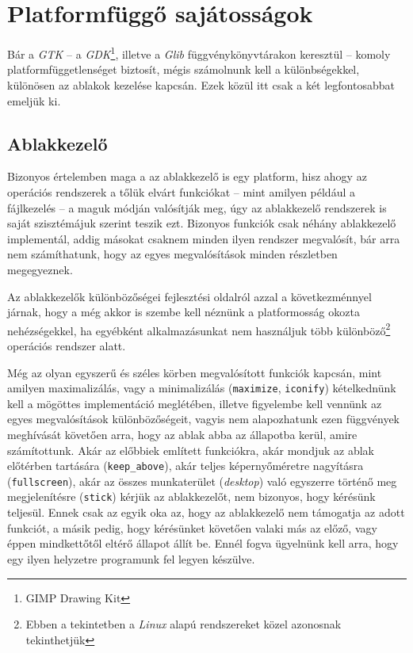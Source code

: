 \section{Platformfüggő sajátosságok}

Bár a \textit{GTK} -- a \textit{GDK}\footnote{GIMP Drawing Kit}, illetve a \textit{Glib} függvénykönyvtárakon keresztül -- komoly platformfüggetlenséget biztosít, mégis számolnunk kell a különbségekkel, különösen az ablakok kezelése kapcsán. Ezek közül itt csak a két legfontosabbat emeljük ki.

\subsection{Ablakkezelő}

Bizonyos értelemben maga a az ablakkezelő is egy platform, hisz ahogy az operációs rendszerek a tőlük elvárt funkciókat -- mint amilyen például a fájlkezelés -- a maguk módján valósítják meg, úgy az ablakkezelő rendszerek is saját szisztémájuk szerint teszik ezt. Bizonyos funkciók csak néhány ablakkezelő implementál, addig másokat csaknem minden ilyen rendszer megvalósít, bár arra nem számíthatunk, hogy az egyes megvalósítások minden részletben megegyeznek.

Az ablakkezelők különbözőségei fejlesztési oldalról azzal a következménnyel járnak, hogy a még akkor is szembe kell néznünk a platformosság okozta nehézségekkel, ha egyébként alkalmazásunkat nem használjuk több különböző\footnote{Ebben a tekintetben a \textit{Linux} alapú rendszereket közel azonosnak tekinthetjük} operációs rendszer alatt.

Még az olyan egyszerű és széles körben megvalósított funkciók kapcsán, mint amilyen maximalizálás, vagy a minimalizálás (\texttt{maximize}, \texttt{iconify}) kételkednünk kell a mögöttes implementáció meglétében, illetve figyelembe kell vennünk az egyes megvalósítások különbözőségeit, vagyis nem alapozhatunk ezen függvények meghívását követően arra, hogy az ablak abba az állapotba kerül, amire számítottunk. Akár az előbbiek említett funkciókra, akár mondjuk az ablak előtérben tartására (\texttt{keep\_above}), akár teljes képernyőméretre nagyításra (\texttt{fullscreen}), akár az összes munkaterület (\textit{desktop}) való egyszerre történő meg megjelenítésre (\texttt{stick}) kérjük az ablakkezelőt, nem bizonyos, hogy kérésünk teljesül. Ennek csak az egyik oka az, hogy az ablakkezelő nem támogatja az adott funkciót, a másik pedig, hogy kérésünket követően valaki más az előző, vagy éppen mindkettőtől eltérő állapot állít be. Ennél fogva ügyelnünk kell arra, hogy egy ilyen helyzetre programunk fel legyen készülve.

